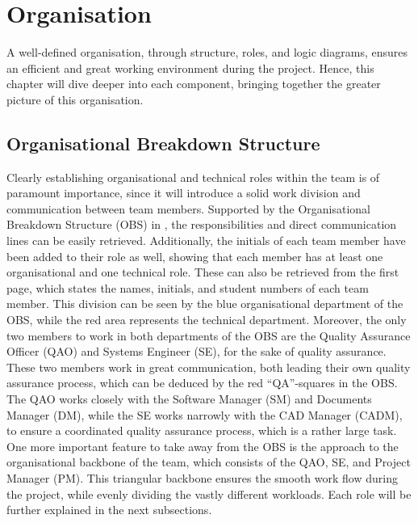 \chapter{Organisation}
\label{ch:Organisation}
A well-defined organisation, through structure, roles, and logic diagrams, ensures an efficient and great working environment during the project.
Hence, this chapter will dive deeper into each component, bringing together the greater picture of this organisation.

\section{Organisational Breakdown Structure}\label{sec:orgbreakdown}
Clearly establishing organisational and technical roles within the team is of paramount importance, since it will introduce a solid work division and communication between team members. 
Supported by the Organisational Breakdown Structure (OBS) in , the responsibilities and direct communication lines can be easily retrieved.
Additionally, the initials of each team member have been added to their role as well, showing that each member has at least one organisational and one technical role.
These can also be retrieved from the first page, which states the names, initials, and student numbers of each team member.
This division can be seen by the blue organisational department of the OBS, while the red area represents the technical department.
Moreover, the only two members to work in both departments of the OBS are the Quality Assurance Officer (QAO) and Systems Engineer (SE), for the sake of quality assurance. 
These two members work in great communication, both leading their own quality assurance process, which can be deduced by the red \enquote{QA}-squares in the OBS.
The QAO works closely with the Software Manager (SM) and Documents Manager (DM), while the SE works narrowly with the CAD Manager (CADM), to ensure a coordinated quality assurance process, which is a rather large task.
One more important feature to take away from the OBS is the approach to the organisational backbone of the team, which consists of the QAO, SE, and Project Manager (PM).
This triangular backbone ensures the smooth work flow during the project, while evenly dividing the vastly different workloads.
Each role will be further explained in the next subsections.


